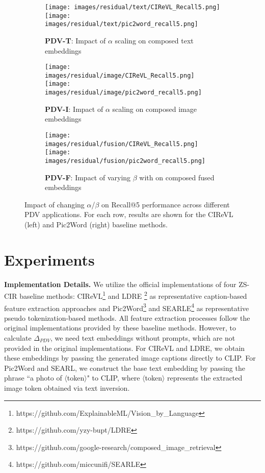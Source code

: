 \begin{figure*}[!h]
    \centering
    \begin{subfigure}[b]{0.8\linewidth}
        \centering
        \texttt{[image: images/residual/text/CIReVL\_Recall5.png]}
        \hfil
        \texttt{[image: images/residual/text/pic2word\_recall5.png]}
        \caption{\textbf{PDV-T}: Impact of $\alpha$ scaling on composed text embeddings}
        \label{fig:residual_text_sub}
    \end{subfigure}
    
    \begin{subfigure}[b]{0.8\linewidth}
        \centering
        \texttt{[image: images/residual/image/CIReVL\_Recall5.png]}
        \hfil
        \texttt{[image: images/residual/image/pic2word\_recall5.png]}
        \caption{\textbf{PDV-I}: Impact of $\alpha$ scaling on composed image embeddings}
        \label{fig:residual_image_sub}
    \end{subfigure}
    
    \begin{subfigure}[b]{0.8\linewidth}
        \centering
        \texttt{[image: images/residual/fusion/CIReVL\_Recall5.png]}
        \hfil
        \texttt{[image: images/residual/fusion/pic2word\_recall5.png]}
        \caption{\textbf{PDV-F}: Impact of varying $\beta$ with on composed fused embeddings}
        \label{fig:residual_fusion_sub}
    \end{subfigure}
    \caption{Impact of changing $\alpha$/$\beta$ on Recall@5 performance across different PDV applications. For each row, results are shown for the CIReVL (left) and Pic2Word (right) baseline methods.}
    \label{fig:residual_all}
\end{figure*}

\section{Experiments} 
\label{sec:exp}
\noindent\textbf{Implementation Details.} We utilize the official implementations of four ZS-CIR baseline methods: CIReVL\footnote{https://github.com/ExplainableML/Vision\_by\_Language} and LDRE \footnote{https://github.com/yzy-bupt/LDRE} as representative caption-based feature extraction approaches and Pic2Word\footnote{https://github.com/google-research/composed\_image\_retrieval} and SEARLE\footnote{https://github.com/miccunifi/SEARLE} as representative pseudo tokenization-based methods. All feature extraction processes follow the original implementations provided by these baseline methods. However, to calculate $\Delta_{PDV}$, we need text embeddings without prompts, which are not provided in the original implementations. For CIReVL and LDRE, we obtain these embeddings by passing the generated image captions directly to CLIP. For Pic2Word and SEARL, we construct the base text embedding by passing the phrase ``a photo of $\langle$token$\rangle$" to CLIP, where $\langle$token$\rangle$ represents the extracted image token obtained via text inversion.


